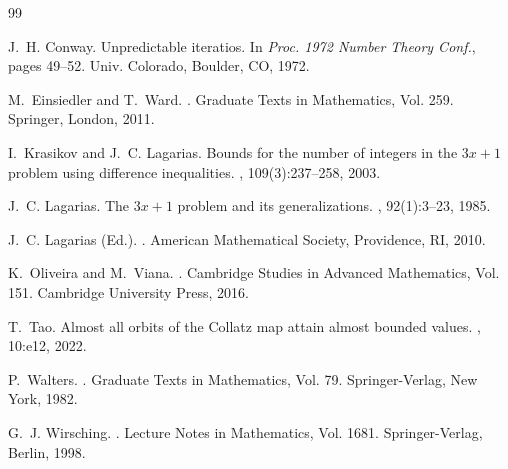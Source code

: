 \documentclass[12 pt]{amsart}
\theoremstyle{definition}
\begin{document}
	
	\begin{thebibliography}{99}
		
		J.~H. Conway.
		\newblock Unpredictable iteratios.
		\newblock In {\em Proc. 1972 Number Theory Conf.}, pages 49--52. Univ. Colorado, Boulder, CO, 1972.
		
		M.~Einsiedler and T.~Ward.
		.
		\newblock Graduate Texts in Mathematics, Vol. 259. Springer, London, 2011.
		
		I.~Krasikov and J.~C. Lagarias.
		\newblock Bounds for the number of integers in the $3x+1$ problem using difference inequalities.
		, 109(3):237--258, 2003.
		
		J.~C. Lagarias.
		\newblock The $3x + 1$ problem and its generalizations.
		, 92(1):3--23, 1985.
		
		J.~C. Lagarias (Ed.).
		.
		\newblock American Mathematical Society, Providence, RI, 2010.
		
		K.~Oliveira and M.~Viana.
		.
		\newblock Cambridge Studies in Advanced Mathematics, Vol. 151. Cambridge University Press, 2016.
		
		T.~Tao.
		\newblock Almost all orbits of the {C}ollatz map attain almost bounded values.
		, 10:e12, 2022.
		
		P.~Walters.
		.
		\newblock Graduate Texts in Mathematics, Vol. 79. Springer-Verlag, New York, 1982.
		
		G.~J. Wirsching.
		.
		\newblock Lecture Notes in Mathematics, Vol. 1681. Springer-Verlag, Berlin, 1998.
		
	\end{thebibliography}
\end{document}
